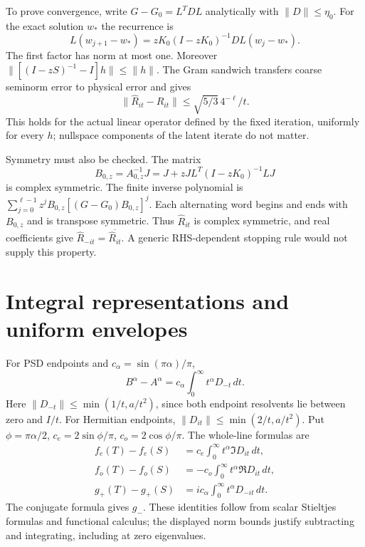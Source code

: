 \documentclass[11pt]{article}
\numberwithin{equation}{section}
\begin{document}
To prove convergence, write $G-G_0=L^TDL$ analytically with
$\|D\|\le\eta_0$. For the exact solution $w_*$ the recurrence is
\[
 L(w_{j+1}-w_*)=zK_0(I-zK_0)^{-1}DL(w_j-w_*).
\]
The first factor has norm at most one. Moreover
$\|[(I-zS)^{-1}-I]h\|\le\|h\|$. The Gram sandwich transfers
coarse seminorm error to physical error and gives
\begin{equation}\label{eq:imagR}
 \|\widehat R_{it}-R_{it}\|
       \le\sqrt{5/3}\,4^{-\ell}/t.
\end{equation}
This holds for the actual linear operator defined by the fixed iteration,
uniformly for every $h$; nullspace components of the latent iterate do
not matter.

Symmetry must also be checked. The matrix
\[
 B_{0,z}=A_{0,z}^{-1}J
       =J+zJL^T(I-zK_0)^{-1}LJ
\]
is complex symmetric. The finite inverse polynomial is
$\sum_{j=0}^{\ell-1}z^jB_{0,z}[(G-G_0)B_{0,z}]^j$.
Each alternating word begins and ends with $B_{0,z}$ and is transpose
symmetric. Thus $\widehat R_{it}$ is complex symmetric, and real
coefficients give $\widehat R_{-it}=\overline{\widehat R_{it}}$.
A generic RHS-dependent stopping rule would not supply this property.

\section{Integral representations and uniform envelopes}

For PSD endpoints and $c_\alpha=\sin(\pi\alpha)/\pi$,
\begin{equation}\label{eq:PSDintegral}
 B^\alpha-A^\alpha
       =c_\alpha\int_0^\infty t^\alpha D_{-t}\,dt.
\end{equation}
Here $\|D_{-t}\|\le\min(1/t,a/t^2)$, since both endpoint resolvents
lie between zero and $I/t$. For Hermitian endpoints,
$\|D_{it}\|\le\min(2/t,a/t^2)$. Put
$\phi=\pi\alpha/2$, $c_e=2\sin\phi/\pi$, $c_o=2\cos\phi/\pi$.
The whole-line formulas are
\begin{align}
 f_e(T)-f_e(S)&=c_e\int_0^\infty t^\alpha\Im D_{it}\,dt,
                                                   \label{eq:evenIntegral}\\
 f_o(T)-f_o(S)&=-c_o\int_0^\infty t^\alpha\Re D_{it}\,dt,\\
 g_+(T)-g_+(S)&=i c_\alpha\int_0^\infty t^\alpha D_{-it}\,dt.
                                                   \label{eq:branchIntegral}
\end{align}
The conjugate formula gives $g_-$. These identities follow from scalar
Stieltjes formulas and functional calculus; the displayed norm bounds
justify subtracting and integrating, including at zero eigenvalues.
\end{document}
